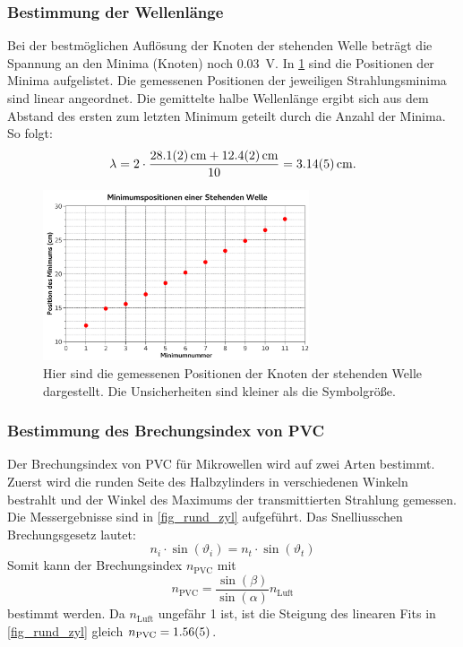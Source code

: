 \documentclass[
	a4paper,
	12pt,
	pagesize,
	ngerman
]{scrartcl}
\begin{document}
	\subsubsection{Bestimmung der Wellenlänge}
	Bei der bestmöglichen Auflösung der Knoten der stehenden Welle beträgt die Spannung an den Minima (Knoten) noch \SI{0,03}{V}.
	In \cref{fig_steh_welle} sind die Positionen der Minima aufgelistet.
	Die gemessenen Positionen der jeweiligen Strahlungsminima sind linear angeordnet. 
	Die gemittelte halbe Wellenlänge ergibt sich aus dem Abstand des ersten zum letzten Minimum geteilt durch die Anzahl der Minima. %
	So folgt: 
	\begin{equation}
		\lambda = 2 \cdot \frac{\SI{28,1 +- 0,2}{cm} + \SI{12,4+-0,2}{cm}}{10} = \SI{3,14 +- 0,05}{cm}.
	\end{equation}
	\begin{figure}[H]
		\includegraphics[width=0.7\textwidth]{fig_steh_welle}
		\centering
		\caption{Hier sind die gemessenen Positionen der Knoten der stehenden Welle dargestellt. Die Unsicherheiten sind kleiner als die Symbolgröße.}
		\label{fig_steh_welle}
		\centering
	\end{figure}
	\subsubsection{Bestimmung des Brechungsindex von PVC}
	Der Brechungsindex von PVC für Mikrowellen wird auf zwei Arten bestimmt. 
	Zuerst wird die runden Seite des Halbzylinders in verschiedenen Winkeln bestrahlt und der Winkel des Maximums der transmittierten Strahlung gemessen.
	Die Messergebnisse sind in \cref{fig_rund_zyl} aufgeführt.
	Das Snelliusschen Brechungsgesetz lautet:
	\begin{equation}
		n_i \cdot \sin(\vartheta_i) = n_t \cdot \sin(\vartheta_t)
		\label{eq_snellius}
	\end{equation}
	Somit kann der Brechungsindex $n_\text{PVC}$  mit 
	\begin{equation}
		n_\text{PVC} = \frac{\sin(\beta)}{\sin(\alpha)} n_\text{Luft}
	\end{equation}
	bestimmt werden.
	Da $n_\text{Luft}$ ungefähr 1 ist, ist die Steigung des linearen Fits in \cref{fig_rund_zyl} gleich $n_\text{PVC}=\SI{1,56 +- 0,05}{}$.
\end{document}
